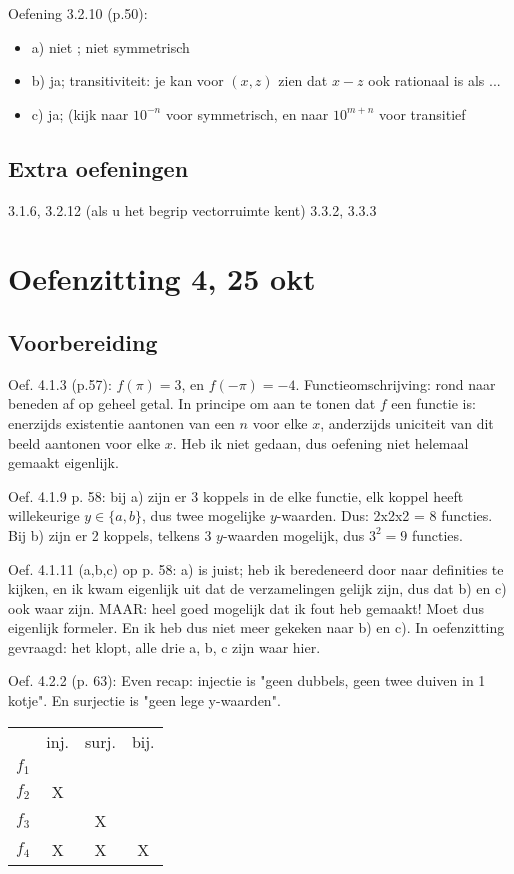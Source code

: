 \documentclass{article}
\begin{document}
Oefening 3.2.10 (p.50): 
\begin{itemize}
    \item a) niet ; niet symmetrisch
    \item b) ja; transitiviteit: je kan voor $(x,z)$ zien dat $x-z$ ook rationaal is als ...
    \item c) ja; (kijk naar $10^{-n}$ voor symmetrisch, en naar $10^{m+n}$ voor transitief
\end{itemize}

\subsection*{Extra oefeningen} 

3.1.6, 
3.2.12 (als u het begrip vectorruimte kent)
3.3.2, 
3.3.3 


\section*{Oefenzitting 4, 25 okt} 


\subsection*{Voorbereiding}

Oef. 4.1.3 (p.57): $f(\pi)=3$, en $f(-\pi)=-4$. Functieomschrijving: rond naar beneden af op geheel getal. In principe om aan te tonen dat $f$ een functie is: enerzijds existentie aantonen van een $n$ voor elke $x$, anderzijds uniciteit van dit beeld aantonen voor elke $x$. Heb ik niet gedaan, dus oefening niet helemaal gemaakt eigenlijk. 


Oef. 4.1.9 p. 58: bij a) zijn er 3 koppels in de elke functie, elk koppel heeft willekeurige $y \in \{ a,b \}$, dus twee mogelijke $y$-waarden. Dus: 2x2x2 = 8 functies. Bij b) zijn er 2 koppels, telkens 3 $y$-waarden mogelijk, dus $3^2=9$ functies. 

Oef. 4.1.11 (a,b,c) op p. 58: 
a) is juist; heb ik beredeneerd door naar definities te kijken, en ik kwam eigenlijk uit dat de verzamelingen gelijk zijn, dus dat b) en c) ook waar zijn. MAAR: heel goed mogelijk dat ik fout heb gemaakt! 
Moet dus eigenlijk formeler. En ik heb dus niet meer gekeken naar b) en c). In oefenzitting gevraagd: het klopt, alle drie a, b, c zijn waar hier. 


Oef. 4.2.2 (p. 63): 
Even recap: injectie is "geen dubbels, geen twee duiven in 1 kotje". En surjectie is "geen lege y-waarden". 

\begin{tabular}{c|c|c|c}
      &  inj. & surj. & bij. \\
$f_1$ &       &       &    \\
$f_2$ &   X   &       &    \\
$f_3$ &       &   X   &    \\
$f_4$ &   X   &   X   & X 
\end{tabular}
\end{document}
